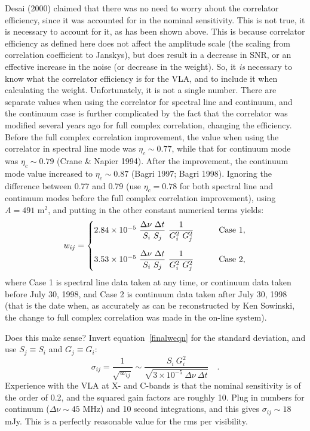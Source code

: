 \documentclass[11pt]{article}
\begin{document}
Desai (2000) claimed that there was no need to worry about the
correlator efficiency, since it was accounted for in the nominal
sensitivity.  This is not true, it is necessary to account for it, as
has been shown above.  This is because correlator efficiency as defined
here does not affect the amplitude scale (the scaling from correlation
coefficient to Janskys), but does result in a decrease in SNR, or an
effective increase in the noise (or decrease in the weight).  So, it
{\it is} necessary to know what the correlator efficiency is for the
VLA, and to include it when calculating the weight.  Unfortunately, it
is not a single number.  There are separate values when using the
correlator for spectral line and continuum, and the continuum case is
further complicated by the fact that the correlator was modified several
years ago for full complex correlation, changing the efficiency.  Before
the full complex correlation improvement, the value when using the
correlator in spectral line mode was $\eta_c \sim 0.77$, while that for
continuum mode was $\eta_c \sim 0.79$ (Crane \& Napier 1994).  After
the improvement, the continuum mode value increased to $\eta_c \sim
0.87$ (Bagri 1997; Bagri 1998).  Ignoring the difference between 0.77
and 0.79 (use $\eta_c = 0.78$ for both spectral line and continuum
modes before the full complex correlation improvement), using $A = 491$
m$^2$, and putting in the other constant numerical terms yields:
\begin{equation}
\label{finalweqn}
   w_{ij} =
      \begin{cases}
         2.84 \times 10^{-5} \
            \dfrac{\Delta\nu \ \Delta{t}}{S_i \ S_j} \
            \dfrac{1}{G_i^2 \ G_j^2} &
            \qquad {\rm Case \ 1}, \\[6truemm]
         3.53 \times 10^{-5} \
            \dfrac{\Delta\nu \ \Delta{t}}{S_i \ S_j} \
            \dfrac{1}{G_i^2 \ G_j^2} &
            \qquad {\rm Case \ 2},
      \end{cases}
\end{equation}
where Case 1 is spectral line data taken at any time, or continuum data
taken before July 30, 1998, and Case 2 is continuum data taken after
July 30, 1998 (that is the date when, as accurately as can be
reconstructed by Ken Sowinski, the change to full complex correlation
was made in the on-line system).

Does this make sense?  Invert equation~\ref{finalweqn} for the standard
deviation, and use $S_j \equiv S_i$ and $G_j \equiv G_i$:
\begin{equation}
   \sigma_{ij} = \frac{1}{\sqrt{w_{ij}}} \sim
                 \frac{S_i \ G_i^2}
                    {\sqrt{3 \times 10^{-5} \ \Delta\nu \ \Delta{t}}}
   \quad .
\end{equation}
Experience with the VLA at X- and C-bands is that the nominal
sensitivity is of the order of 0.2, and the squared gain factors are
roughly 10.  Plug in numbers for continuum ($\Delta\nu \sim 45$ MHz) and
10 second integrations, and this gives $\sigma_{ij} \sim 18$ mJy.  This
is a perfectly reasonable value for the rms per visibility.
\end{document}
